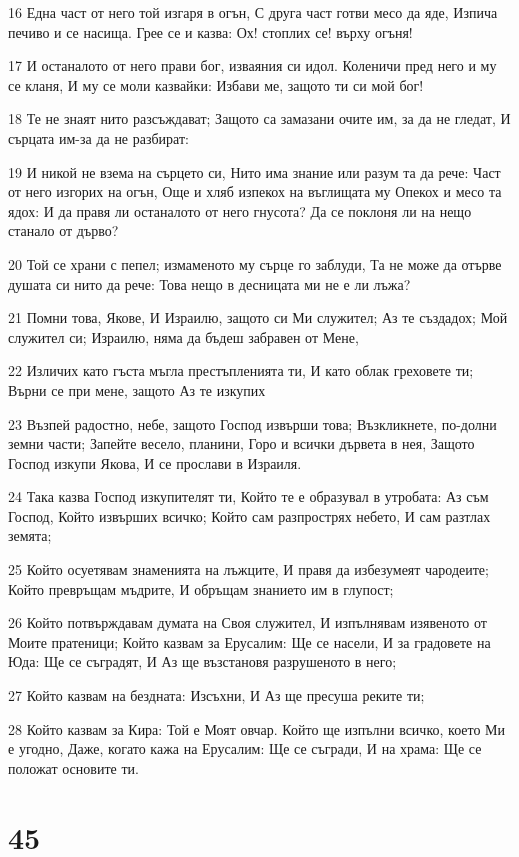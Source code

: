 \par 16 Една част от него той изгаря в огън, С друга част готви месо да яде, Изпича печиво и се насища. Грее се и казва: Ох! стоплих се! върху огъня!
\par 17 И останалото от него прави бог, изваяния си идол. Коленичи пред него и му се кланя, И му се моли казвайки: Избави ме, защото ти си мой бог!
\par 18 Те не знаят нито разсъждават; Защото са замазани очите им, за да не гледат, И сърцата им-за да не разбират:
\par 19 И никой не взема на сърцето си, Нито има знание или разум та да рече: Част от него изгорих на огън, Още и хляб изпекох на въглищата му Опекох и месо та ядох: И да правя ли останалото от него гнусота? Да се поклоня ли на нещо станало от дърво?
\par 20 Той се храни с пепел; измаменото му сърце го заблуди, Та не може да отърве душата си нито да рече: Това нещо в десницата ми не е ли лъжа?
\par 21 Помни това, Якове, И Израилю, защото си Ми служител; Аз те създадох; Мой служител си; Израилю, няма да бъдеш забравен от Мене,
\par 22 Изличих като гъста мъгла престъпленията ти, И като облак греховете ти; Върни се при мене, защото Аз те изкупих
\par 23 Възпей радостно, небе, защото Господ извърши това; Възкликнете, по-долни земни части; Запейте весело, планини, Горо и всички дървета в нея, Защото Господ изкупи Якова, И се прослави в Израиля.
\par 24 Така казва Господ изкупителят ти, Който те е образувал в утробата: Аз съм Господ, Който извърших всичко; Който сам разпрострях небето, И сам разтлах земята;
\par 25 Който осуетявам знаменията на лъжците, И правя да избезумеят чародеите; Който превръщам мъдрите, И обръщам знанието им в глупост;
\par 26 Който потвърждавам думата на Своя служител, И изпълнявам изявеното от Моите пратеници; Който казвам за Ерусалим: Ще се насели, И за градовете на Юда: Ще се съградят, И Аз ще възстановя разрушеното в него;
\par 27 Който казвам на бездната: Изсъхни, И Аз ще пресуша реките ти;
\par 28 Който казвам за Кира: Той е Моят овчар. Който ще изпълни всичко, което Ми е угодно, Даже, когато кажа на Ерусалим: Ще се съгради, И на храма: Ще се положат основите ти.

\chapter{45}

